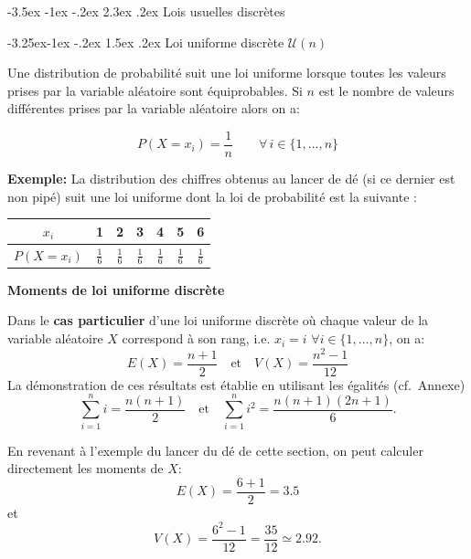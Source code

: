 \documentclass[]{book}
\makeatletter
\renewcommand\section{\@startsection {section}{1}{\z@}%
                                   {-3.5ex \@plus -1ex \@minus -.2ex}%
                                   {2.3ex \@plus.2ex}%
                                   {\normalfont\Large\bfseries\color{ForestGreen}}}
\renewcommand\subsection{\@startsection{subsection}{2}{\z@}%
                                     {-3.25ex\@plus -1ex \@minus -.2ex}%
                                     {1.5ex \@plus .2ex}%
                                     {\normalfont\large\bfseries\color{Violet}}}
\theoremstyle{magentacolor}
\theoremstyle{proprie}
\theoremstyle{exstyle}
\theoremstyle{exostyle}
\theoremstyle{definition}
\theoremstyle{definition}
\theoremstyle{definition}
\theoremstyle{remark}
\let\BeginKnitrBlock\begin \let\EndKnitrBlock\end
\makeatother
\begin{document}
\hypertarget{lois-usuelles-discretes}{%
\section{Lois usuelles discrètes}\label{lois-usuelles-discretes}}

\hypertarget{loi-uniforme-discrete-mathcalun}{%
\subsection{\texorpdfstring{Loi uniforme discrète \(\mathcal{U}(n)\)}{Loi uniforme discrète \textbackslash mathcal\{U\}(n)}}\label{loi-uniforme-discrete-mathcalun}}

\BeginKnitrBlock{definition}
\protect\hypertarget{def:unnamed-chunk-21}{}{\label{def:unnamed-chunk-21} }Une distribution de probabilité suit une loi uniforme lorsque toutes les
valeurs prises par la variable aléatoire sont équiprobables. Si \(n\) est
le nombre de valeurs différentes prises par la variable aléatoire alors
on a:

\[\label{eq:unif}
    P(X=x_i)=\frac{1}{n} \qquad \forall \, i \in \{1,\ldots, n\}\]
\EndKnitrBlock{definition}

\textbf{Exemple:} La distribution des chiffres obtenus au lancer de dé (si ce dernier est
non pipé) suit une loi uniforme dont la loi de probabilité est la
suivante :

\begin{longtable}[]{@{}ccccccc@{}}
\toprule
\(x_i\) & 1 & 2 & 3 & 4 & 5 & 6\tabularnewline
\midrule
\endhead
\(P(X = x_i)\) & \(\frac{1}{6}\) & \(\frac{1}{6}\) & \(\frac{1}{6}\) & \(\frac{1}{6}\) & \(\frac{1}{6}\) & \(\frac{1}{6}\)\tabularnewline
\bottomrule
\end{longtable}

\textbf{Moments de loi uniforme discrète}

Dans le \textbf{cas particulier} d'une loi uniforme discrète où chaque valeur
de la variable aléatoire \(X\) correspond à son rang, i.e.
\(x_i=i \, \, \forall i \in \{1,\ldots, n\}\), on a:
\[E(X)=\frac{n+1}{2} \quad \text{et} \quad V(X)=\frac{n^2-1}{12}\] La
démonstration de ces résultats est établie en utilisant les égalités
(cf.~Annexe)
\[\sum_{i=1}^n i=\frac{n(n+1)}{2} \quad \text{et} \quad \sum_{i=1}^n i^2=\frac{n(n+1)(2n+1)}{6}.\]

En revenant à l'exemple du lancer du dé de cette section, on peut
calculer directement les moments de \(X\): \[E(X)=\frac{6+1}{2}=3.5\] et
\[V(X)=\frac{6^2-1}{12}=\frac{35}{12}\simeq 2.92.\]
\end{document}
